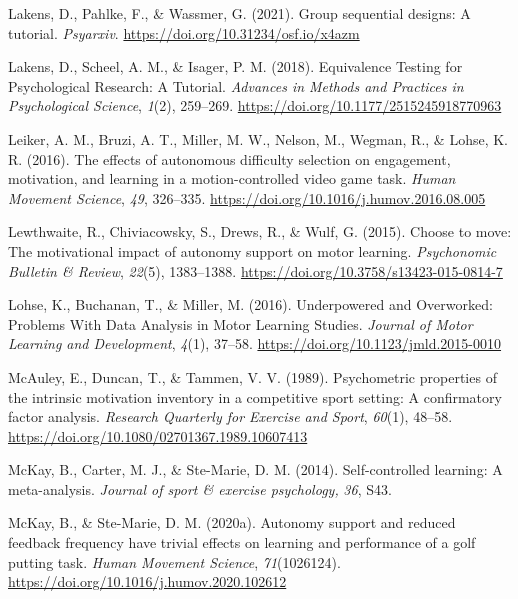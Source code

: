 \documentclass[
  english,
  man, donotrepeattitle,floatsintext]{apa7}
\newlength{\cslhangindent}
\newlength{\cslentryspacingunit} %
\newenvironment{CSLReferences}[2] %
 {%
  \setlength{\parindent}{0pt}
  \ifodd #1
  \let\oldpar\par
  \def\par{\hangindent=\cslhangindent\oldpar}
  \fi
  \setlength{\parskip}{#2\cslentryspacingunit}
 }%
 {}
\begin{document}
\begin{CSLReferences}{1}{0}
\leavevmode{}%
Lakens, D., Pahlke, F., \& Wassmer, G. (2021). Group sequential designs: A tutorial. \emph{Psyarxiv}. \url{https://doi.org/10.31234/osf.io/x4azm}

\leavevmode{}%
Lakens, D., Scheel, A. M., \& Isager, P. M. (2018). Equivalence Testing for Psychological Research: A Tutorial. \emph{Advances in Methods and Practices in Psychological Science}, \emph{1}(2), 259--269. \url{https://doi.org/10.1177/2515245918770963}

\leavevmode{}%
Leiker, A. M., Bruzi, A. T., Miller, M. W., Nelson, M., Wegman, R., \& Lohse, K. R. (2016). The effects of autonomous difficulty selection on engagement, motivation, and learning in a motion-controlled video game task. \emph{Human Movement Science}, \emph{49}, 326--335. \url{https://doi.org/10.1016/j.humov.2016.08.005}

\leavevmode{}%
Lewthwaite, R., Chiviacowsky, S., Drews, R., \& Wulf, G. (2015). Choose to move: The motivational impact of autonomy support on motor learning. \emph{Psychonomic Bulletin \& Review}, \emph{22}(5), 1383--1388. \url{https://doi.org/10.3758/s13423-015-0814-7}

\leavevmode{}%
Lohse, K., Buchanan, T., \& Miller, M. (2016). Underpowered and Overworked: Problems With Data Analysis in Motor Learning Studies. \emph{Journal of Motor Learning and Development}, \emph{4}(1), 37--58. \url{https://doi.org/10.1123/jmld.2015-0010}

\leavevmode{}%
McAuley, E., Duncan, T., \& Tammen, V. V. (1989). Psychometric properties of the intrinsic motivation inventory in a competitive sport setting: A confirmatory factor analysis. \emph{Research Quarterly for Exercise and Sport}, \emph{60}(1), 48--58. \url{https://doi.org/10.1080/02701367.1989.10607413}

\leavevmode{}%
McKay, B., Carter, M. J., \& Ste-Marie, D. M. (2014). Self-controlled learning: A meta-analysis. \emph{Journal of sport \& exercise psychology,} \emph{36}, S43.

\leavevmode{}%
McKay, B., \& Ste-Marie, D. M. (2020a). Autonomy support and reduced feedback frequency have trivial effects on learning and performance of a golf putting task. \emph{Human Movement Science}, \emph{71}(1026124). \url{https://doi.org/10.1016/j.humov.2020.102612}


\end{CSLReferences}
\end{document}
